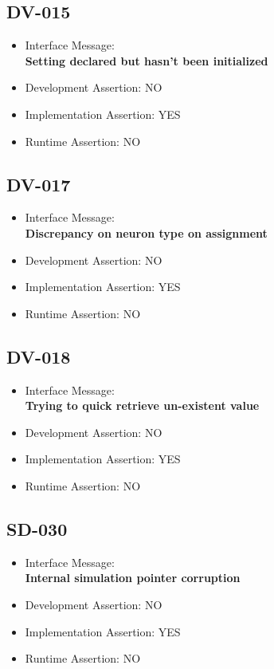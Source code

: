 \subsection{DV-015}
\begin{itemize}
  \item Interface Message:\\[1em]
    \textbf{Setting declared but hasn't been initialized}
  \item Development Assertion: NO
  \item Implementation Assertion: YES
  \item Runtime Assertion: NO
\end{itemize}

\subsection{DV-017}
\begin{itemize}
  \item Interface Message:\\[1em]
    \textbf{Discrepancy on neuron type on assignment}
  \item Development Assertion: NO
  \item Implementation Assertion: YES
  \item Runtime Assertion: NO
\end{itemize}

\subsection{DV-018}
\begin{itemize}
  \item Interface Message:\\[1em]
    \textbf{Trying to quick retrieve un-existent value}
  \item Development Assertion: NO
  \item Implementation Assertion: YES
  \item Runtime Assertion: NO
\end{itemize}

\subsection{SD-030}
\begin{itemize}
  \item Interface Message:\\[1em]
    \textbf{Internal simulation pointer corruption}
  \item Development Assertion: NO
  \item Implementation Assertion: YES
  \item Runtime Assertion: NO
\end{itemize}

